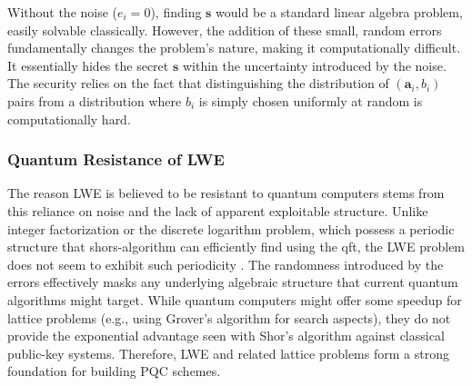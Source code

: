 Without the noise ($e_i = 0$), finding $\mathbf{s}$ would be a standard linear algebra problem, easily solvable classically. However, the addition of these small, random errors fundamentally changes the problem's nature, making it computationally difficult. It essentially hides the secret $\mathbf{s}$ within the uncertainty introduced by the noise. The security relies on the fact that distinguishing the distribution of $(\mathbf{a}_i, b_i)$ pairs from a distribution where $b_i$ is simply chosen uniformly at random is computationally hard.
\newpage

\subsubsection{Quantum Resistance of LWE}
The reason LWE is believed to be resistant to quantum computers stems from this reliance on noise and the lack of apparent exploitable structure. Unlike integer factorization or the discrete logarithm problem, which possess a periodic structure that \gls{shors-algorithm} can efficiently find using the \gls{qft}, the LWE problem does not seem to exhibit such periodicity \parencite{bernstein2017post}. The randomness introduced by the errors effectively masks any underlying algebraic structure that current quantum algorithms might target. While quantum computers might offer some speedup for lattice problems (e.g., using Grover's algorithm for search aspects), they do not provide the exponential advantage seen with Shor's algorithm against classical public-key systems. Therefore, LWE and related lattice problems form a strong foundation for building PQC schemes.

